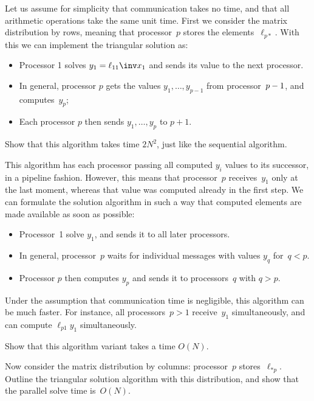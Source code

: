 Let us assume for simplicity that communication takes no time, and
that all arithmetic operations take the same unit time.
First we consider the matrix distribution by rows,
meaning that processor~$p$ stores the elements~$\ell_{p*}$.
With this we can implement the triangular solution as:
\begin{itemize}
\item Processor 1 solves $y_1=\ell_{11}\inv x_1$ and sends its value to the next processor.
\item In general, processor $p$ gets the values $y_1,\ldots,y_{p-1}$
  from processor~$p-\nobreak1$, and computes~$y_p$;
\item Each processor $p$ then sends $y_1,\ldots,y_p$ to $p+1$.
\end{itemize}

\begin{exercise}
  Show that this algorithm takes time $2N^2$, just like the sequential algorithm.
\end{exercise}

This algorithm has each processor passing all computed $y_i$ values to its successor, in a pipeline fashion.
However, this means that processor~$p$ receives~$y_1$ only at the last moment, whereas that value was computed
already in the first step. We can formulate the solution algorithm in such a way that computed elements
are made available as soon as possible:
\begin{itemize}
\item Processor~1 solve $y_1$, and sends it to all later processors.
\item In general, processor~$p$ waits for individual messages with values $y_q$ for~$q<p$.
\item Processor $p$ then computes $y_p$ and sends it to processors~$q$ with $q>p$.
\end{itemize}

Under the assumption that communication time is negligible, this algorithm can be much faster.
For instance, all processors~$p>1$ receive~$y_1$ simultaneously, and can compute $\ell_{p1}y_1$
simultaneously.

\begin{exercise}
  Show that this algorithm variant takes a time $O(N)$.
\end{exercise}

\begin{exercise}
  Now consider the matrix distribution by columns: processor~$p$ stores~$\ell_{*p}$.
  Outline the triangular solution algorithm with this distribution, and show that the
  parallel solve time is~$O(N)$.
\end{exercise}

